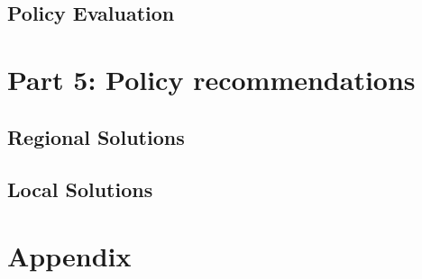 \documentclass[
  letterpaper,
  DIV=11,
  numbers=noendperiod]{scrreprt}
\begin{document}
\hypertarget{policy-evaluation}{%
\chapter{Policy Evaluation}\label{policy-evaluation}}

\part{Part 5: Policy recommendations}

\hypertarget{regional-solutions}{%
\chapter{Regional Solutions}\label{regional-solutions}}

\hypertarget{local-solutions}{%
\chapter{Local Solutions}\label{local-solutions}}

\part{Appendix}
\end{document}
